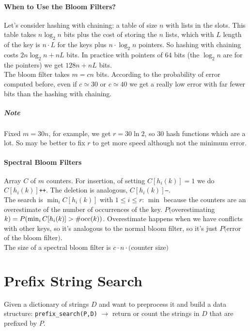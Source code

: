 \documentclass[10pt]{report}
\begin{document}
\paragraph{When to Use the Bloom Filters?} Let's consider hashing with chaining: a table of size $n$ with lists in the slots. This table takes $n\log_2 n$ bits plus the cost of storing the $n$ lists, which with $L$ length of the key is $n\cdot L$ for the keys plus $n\cdot \log_2 n$ pointers. So hashing with chaining costs $2n\log_2n + nL$ bits. In practice with pointers of $64$ bits (the $\log_2 n$ are for the pointers) we get $128n+nL$ bits.\\
The bloom filter takes $m=cn$ bits. According to the probability of error computed before, even if $c\simeq 30$ or $c\simeq 40$ we get a really low error with far fewer bits than the hashing with chaining.
\subparagraph{Note} Fixed $m=30n$, for example, we get $r=30\ln 2$, so $30$ hash functions which are a lot. So may be better to fix $r$ to get more speed although not the minimum error.
\paragraph{Spectral Bloom Filters} Array $C$ of $m$ counters. For insertion, of setting $C[h_i(k)] = 1$ we do $C[h_i(k)]$\texttt{++}. The deletion is analogous, $C[h_i(k)]$\texttt{--}.\\
The search is $\min_i C[h_i(k)]$ with $1\leq i\leq r$: $\min$ because the counters are an overestimate of the number of occurrences of the key. $P($overestimating $k)=P(\min_i C[h_i(k)]>\#\hbox{occ}(k))$. Overestimate happens when we have conflicts with other keys, so it's analogous to the normal bloom filter, so it's just $P($error of the bloom filter$)$.\\
The size of a spectral bloom filter is $c\cdot n\cdot($counter size$)$
\section{Prefix String Search}
Given a dictionary of strings $D$ and want to preprocess it and build a data structure: \texttt{prefix\_search(P,D)} $\rightarrow$ return or count the strings in $D$ that are prefixed by $P$.
\end{document}
